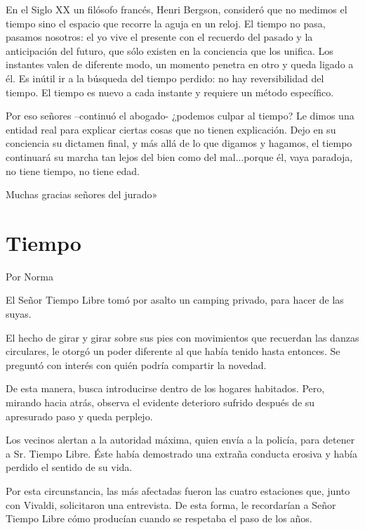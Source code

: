 \documentclass[11pt,twoside,openright,a5paper]{book}
\begin{document}
En el Siglo XX un filósofo francés, Henri Bergson, consideró que no medimos el tiempo sino el espacio que recorre la aguja en un reloj. El tiempo no pasa, pasamos nosotros: el yo vive el presente con el recuerdo del pasado y la anticipación del futuro, que sólo existen en la conciencia que los unifica. Los instantes valen de diferente modo, un momento penetra en otro y queda ligado a él. Es inútil ir a la búsqueda del tiempo perdido: no hay reversibilidad del tiempo. El tiempo es nuevo a cada instante y requiere un método específico.

Por eso señores –continuó el abogado- ¿podemos culpar al tiempo? Le dimos una entidad real para explicar ciertas cosas que no tienen explicación. Dejo en su conciencia su dictamen final, y más allá de lo que digamos y hagamos, el tiempo continuará su marcha tan lejos del bien como del mal...porque él, vaya paradoja, no tiene tiempo, no tiene edad.

Muchas gracias señores del jurado»

\section*{Tiempo}

                                                                                                         \begin{flushright}Por Norma\end{flushright}

El Señor Tiempo Libre tomó por asalto un camping privado, para hacer de las suyas.

El hecho de girar y girar sobre sus pies con movimientos que recuerdan las danzas circulares, le otorgó un poder diferente al que había tenido hasta entonces. Se preguntó con interés con quién podría compartir la novedad.

De esta manera, busca introducirse dentro de los hogares habitados. Pero, mirando hacia atrás, observa el evidente deterioro sufrido después de su apresurado paso y queda perplejo.

Los vecinos alertan a la autoridad máxima, quien envía a la policía, para detener a Sr. Tiempo Libre. Éste había demostrado una extraña conducta erosiva y había perdido el sentido de su vida.

Por esta circunstancia, las más afectadas fueron las cuatro estaciones que, junto con Vivaldi, solicitaron una entrevista. De esta forma, le recordarían a Señor Tiempo Libre cómo producían cuando se respetaba el paso de los años.
\end{document}
